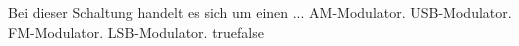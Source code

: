     {Bei dieser Schaltung handelt es sich um einen ...}
    {AM-Modulator.}
    {USB-Modulator.}
    {FM-Modulator.}
    {LSB-Modulator.}
    {true}{false}